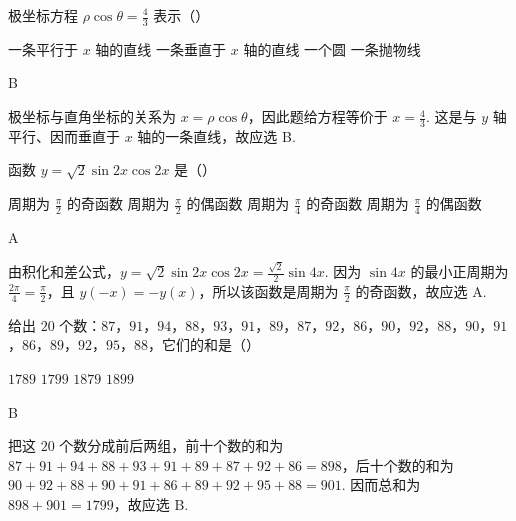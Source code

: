 \documentclass[UTF8,a4paper,oneside,11pt]{ctexbook}
\begin{document}
\begin{problem}

极坐标方程 \(\rho \cos \theta = \frac{4}{3}\) 表示（\quad）

\choices
    {一条平行于 \(x\) 轴的直线}
    {一条垂直于 \(x\) 轴的直线}
    {一个圆}
    {一条抛物线}
\end{problem}

\begin{answer}
B
\end{answer}

\begin{solution}
极坐标与直角坐标的关系为 \(x=\rho\cos\theta\)，因此题给方程等价于 \(x=\frac{4}{3}\). 这是与 \(y\) 轴平行、因而垂直于 \(x\) 轴的一条直线，故应选 B.
\end{solution}

\begin{problem}

函数 \(y = \sqrt{2}\sin 2x \cos 2x\) 是（\quad）

\choices
    {周期为 \(\frac{\pi}{2}\) 的奇函数}
    {周期为 \(\frac{\pi}{2}\) 的偶函数}
    {周期为 \(\frac{\pi}{4}\) 的奇函数}
    {周期为 \(\frac{\pi}{4}\) 的偶函数}
\end{problem}

\begin{answer}
A
\end{answer}

\begin{solution}
由积化和差公式，\(y=\sqrt{2}\sin 2x\cos 2x=\frac{\sqrt{2}}{2}\sin 4x\). 因为 \(\sin 4x\) 的最小正周期为 \(\frac{2\pi}{4}=\frac{\pi}{2}\)，且 \(y(-x)=-y(x)\)，所以该函数是周期为 \(\frac{\pi}{2}\) 的奇函数，故应选 A.
\end{solution}

\begin{problem}

给出 \(20\) 个数：\(87\)，\(91\)，\(94\)，\(88\)，\(93\)，\(91\)，\(89\)，\(87\)，\(92\)，\(86\)，\(90\)，\(92\)，\(88\)，\(90\)，\(91\)，\(86\)，\(89\)，\(92\)，\(95\)，\(88\)，它们的和是（\quad）

\choices
    {\(1789\)}
    {\(1799\)}
    {\(1879\)}
    {\(1899\)}
\end{problem}

\begin{answer}
B
\end{answer}

\begin{solution}
把这 \(20\) 个数分成前后两组，前十个数的和为 \(87+91+94+88+93+91+89+87+92+86=898\)，后十个数的和为 \(90+92+88+90+91+86+89+92+95+88=901\). 因而总和为 \(898+901=1799\)，故应选 B.
\end{solution}
\end{document}
